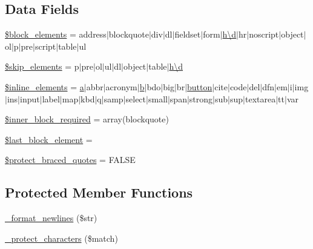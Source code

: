 \subsection*{Data Fields}
\begin{DoxyCompactItemize}
\item 
\hyperlink{class_c_i___typography_ac99f5bbe8e02dc1147e9a4205dc161eb}{\$block\+\_\+elements} = \textquotesingle{}address$\vert$blockquote$\vert$div$\vert$dl$\vert$fieldset$\vert$form$\vert$\hyperlink{assets_2js_2bootstrap_8min_8js_aeb337d295abaddb5ec3cb34cc2e2bbc9}{h\textbackslash{}d}$\vert$hr$\vert$noscript$\vert$object$\vert$ol$\vert$p$\vert$pre$\vert$script$\vert$table$\vert$ul\textquotesingle{}
\item 
\hyperlink{class_c_i___typography_a80c70a349bff88ad1ef94dea8753bc2e}{\$skip\+\_\+elements} = \textquotesingle{}p$\vert$pre$\vert$ol$\vert$ul$\vert$dl$\vert$object$\vert$table$\vert$\hyperlink{assets_2js_2bootstrap_8min_8js_aeb337d295abaddb5ec3cb34cc2e2bbc9}{h\textbackslash{}d}\textquotesingle{}
\item 
\hyperlink{class_c_i___typography_a7ee5f0598125dc7e6b17a08aa6da384f}{\$inline\+\_\+elements} = \textquotesingle{}\hyperlink{assets_2js_2bootstrap_8min_8js_a1f5870dcf487187f13d5fd328ed9e6e7}{a}$\vert$abbr$\vert$acronym$\vert$\hyperlink{assets_2js_2bootstrap_8min_8js_a398bb8542498d1b14178b02b99df309b}{b}$\vert$bdo$\vert$big$\vert$br$\vert$\hyperlink{assets_2js_2bootstrap_8min_8js_a55e170814e74f6c3db8ae9ea3ba9054f}{button}$\vert$cite$\vert$code$\vert$del$\vert$dfn$\vert$em$\vert$i$\vert$img$\vert$ins$\vert$input$\vert$label$\vert$map$\vert$kbd$\vert$q$\vert$samp$\vert$select$\vert$small$\vert$span$\vert$strong$\vert$sub$\vert$sup$\vert$textarea$\vert$tt$\vert$var\textquotesingle{}
\item 
\hyperlink{class_c_i___typography_a822eaf22f556c5c52bd766779d9ee22f}{\$inner\+\_\+block\+\_\+required} = array(\textquotesingle{}blockquote\textquotesingle{})
\item 
\hyperlink{class_c_i___typography_a8d5c4b7f2f7b74e118c682cf95688e22}{\$last\+\_\+block\+\_\+element} = \textquotesingle{}\textquotesingle{}
\item 
\hyperlink{class_c_i___typography_a6a74364571da23cc7187c864cde167ca}{\$protect\+\_\+braced\+\_\+quotes} = F\+A\+L\+S\+E
\end{DoxyCompactItemize}
\subsection*{Protected Member Functions}
\begin{DoxyCompactItemize}
\item 
\hyperlink{class_c_i___typography_ac3384cbfc88fcd17e40624bdd6002801}{\+\_\+format\+\_\+newlines} (\$str)
\item 
\hyperlink{class_c_i___typography_a03e8f97de4301e0fe0cf0e9f0bcd936c}{\+\_\+protect\+\_\+characters} (\$match)
\end{DoxyCompactItemize}


